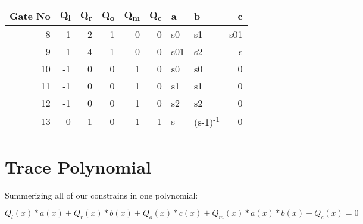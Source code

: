 \documentclass[11pt]{article}
\begin{document}
\begin{center}
\begin{tabular}{rrrrrrllr}
Gate No & Q\textsubscript{l} & Q\textsubscript{r} & Q\textsubscript{o} & Q\textsubscript{m} & Q\textsubscript{c} & a & b & c\\[0pt]
\hline
8 & 1 & 2 & -1 & 0 & 0 & s0 & s1 & s01\\[0pt]
9 & 1 & 4 & -1 & 0 & 0 & s01 & s2 & s\\[0pt]
10 & -1 & 0 & 0 & 1 & 0 & s0 & s0 & 0\\[0pt]
11 & -1 & 0 & 0 & 1 & 0 & s1 & s1 & 0\\[0pt]
12 & -1 & 0 & 0 & 1 & 0 & s2 & s2 & 0\\[0pt]
13 & 0 & -1 & 0 & 1 & -1 & s & (s-1)\textsuperscript{-1} & 0\\[0pt]
\hline
\end{tabular}
\end{center}

\section{Trace Polynomial}
\label{sec:orgf389178}
Summerizing all of our constrains in one polynomial:

\(Q_l(x)*a(x) + Q_r(x)*b(x) + Q_o(x)* c(x) + Q_m(x)*a(x)*b(x) + Q_c(x) = 0\)
\end{document}
